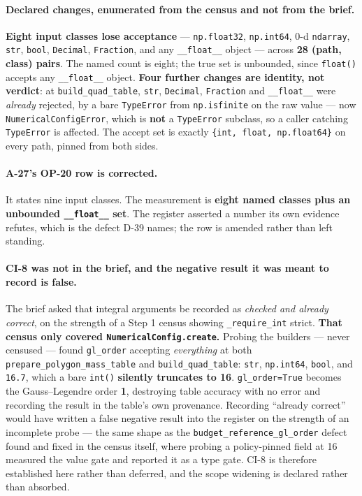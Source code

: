 \documentclass[
  10pt,
]{article}
\begin{document}
\paragraph{Declared changes, enumerated from the census and not from the brief.}
\textbf{Eight input classes lose acceptance} --- \texttt{np.float32}, \texttt{np.int64}, 0-d \texttt{ndarray}, \texttt{str}, \texttt{bool}, \texttt{Decimal}, \texttt{Fraction}, and any \texttt{\_\_float\_\_} object --- across \textbf{28 (path, class) pairs}. The named count is eight; the true set is unbounded, since \texttt{float()} accepts any \texttt{\_\_float\_\_} object. \textbf{Four further changes are identity, not verdict}: at \texttt{build\_quad\_table}, \texttt{str}, \texttt{Decimal}, \texttt{Fraction} and \texttt{\_\_float\_\_} were \emph{already} rejected, by a bare \texttt{TypeError} from \texttt{np.isfinite} on the raw value --- now \texttt{NumericalConfigError}, which is \textbf{not} a \texttt{TypeError} subclass, so a caller catching \texttt{TypeError} is affected. The accept set is exactly \texttt{\{int, float, np.float64\}} on every path, pinned from both sides.

\paragraph{A-27's OP-20 row is corrected.}
It states nine input classes. The measurement is \textbf{eight named classes plus an unbounded \texttt{\_\_float\_\_} set}. The register asserted a number its own evidence refutes, which is the defect D-39 names; the row is amended rather than left standing.

\paragraph{CI-8 was not in the brief, and the negative result it was meant to record is false.}
The brief asked that integral arguments be recorded as \emph{checked and already correct}, on the strength of a Step 1 census showing \texttt{\_require\_int} strict. \textbf{That census only covered \texttt{NumericalConfig.create}.} Probing the builders --- never censused --- found \texttt{gl\_order} accepting \emph{everything} at both \texttt{prepare\_polygon\_mass\_table} and \texttt{build\_quad\_table}: \texttt{str}, \texttt{np.int64}, \texttt{bool}, and \texttt{16.7}, which a bare \texttt{int()} \textbf{silently truncates to 16}. \texttt{gl\_order=True} becomes the Gauss--Legendre order \textbf{1}, destroying table accuracy with no error and recording the result in the table's own provenance. Recording ``already correct'' would have written a false negative result into the register on the strength of an incomplete probe --- the same shape as the \texttt{budget\_reference\_gl\_order} defect found and fixed in the census itself, where probing a policy-pinned field at 16 measured the value gate and reported it as a type gate. CI-8 is therefore established here rather than deferred, and the scope widening is declared rather than absorbed.
\end{document}
